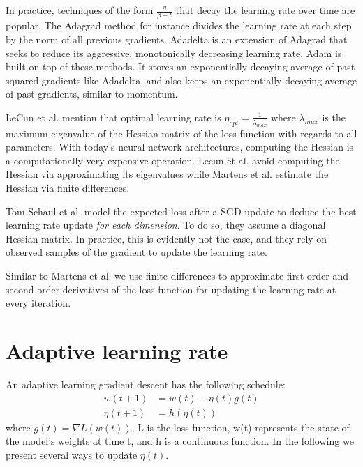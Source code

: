 \documentclass{article}
\begin{document}
  In practice, techniques of the form $\frac{\eta}{\beta+t}$ that decay the learning rate over time are popular. The Adagrad method \cite{duchi2011adaptive} for instance divides the learning rate at each step by the norm of all previous gradients. Adadelta \cite{zeiler2012adadelta} is an extension of Adagrad that seeks to reduce its aggressive, monotonically decreasing learning rate. Adam \cite{kingma2014adam} is built on top of these methods. It stores an exponentially decaying average of past squared gradients like Adadelta, and also keeps an exponentially decaying average of past gradients, similar to momentum.
  
  LeCun et al. \cite{lecun1998gradient} mention that optimal learning rate is $\eta_{opt} = \frac{1}{\lambda_{max}}$ where $\lambda_{max}$ is the maximum eigenvalue of the Hessian matrix of the loss function with regards to all parameters. With today's neural network architectures, computing the Hessian is a computationally very expensive operation. Lecun et al. avoid computing the Hessian via approximating its eigenvalues while Martens et al. \cite{martens2010deep} estimate the Hessian via finite differences.
  
  Tom Schaul et al. \cite{schaul2013no} model the expected loss after a SGD update to deduce the best learning rate update \emph{for each dimension}. To do so, they assume a diagonal Hessian matrix. In practice, this is evidently not the case, and they rely on observed samples of the gradient to update the learning rate.
  
  Similar to Martens et al. we use finite differences to approximate first order and second order derivatives of the loss function for updating the learning rate at every iteration.
  
  
  
  \section{Adaptive learning rate}
  
  An adaptive learning gradient descent has the following schedule:\\
  \begin{align}
  w(t+1) &= w(t) -\eta(t)g(t)\\
  \eta(t+1) &= h(\eta(t))
  \end{align}
  where $g(t) = \nabla L(w(t))$, L is the loss function, w(t) represents the state of the model's weights at time t, and h is a continuous function. In the following we present several ways to update $\eta(t)$.
  
\end{document}
